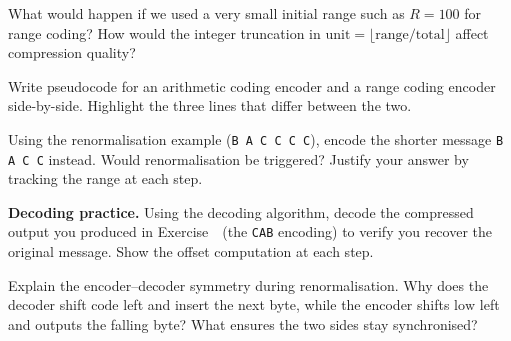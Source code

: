 \begin{exercisebox}
What would happen if we used a very small initial range such as $R=100$ for
range coding?  How would the integer truncation in
$\mathrm{unit} = \lfloor \mathrm{range}/\mathrm{total} \rfloor$ affect
compression quality?
\end{exercisebox}

\begin{exercisebox}
Write pseudocode for an arithmetic coding encoder and a range coding encoder
side-by-side.  Highlight the three lines that differ between the two.
\end{exercisebox}

\begin{exercisebox}
Using the renormalisation example (\texttt{B A C C C C}), encode the shorter
message \texttt{B A C C} instead.  Would renormalisation be triggered?
Justify your answer by tracking the range at each step.
\end{exercisebox}

\begin{exercisebox}
\textbf{Decoding practice.}  Using the decoding algorithm, decode the
compressed output you produced in Exercise~\theexercise\  (the \texttt{CAB}
encoding) to verify you recover the original message.  Show the offset
computation at each step.
\end{exercisebox}

\begin{exercisebox}
Explain the encoder–decoder symmetry during renormalisation.  Why does the
decoder shift $\mathrm{code}$ left and insert the next byte, while the
encoder shifts $\mathrm{low}$ left and outputs the falling byte?  What
ensures the two sides stay synchronised?
\end{exercisebox}
